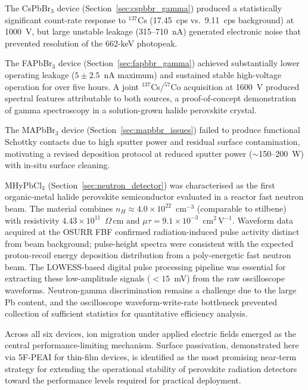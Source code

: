 The CsPbBr$_3$ device (Section~\ref{sec:cspbbr_gamma}) produced
a statistically significant count-rate response to $^{137}$Cs
(17.45~cps vs.\ 9.11~cps background) at 1000~V, but large
unstable leakage (315--710~nA) generated electronic noise that
prevented resolution of the 662-keV photopeak.

The FAPbBr$_3$ device (Section~\ref{sec:fapbbr_gamma}) achieved
substantially lower operating leakage ($5 \pm 2.5$~nA maximum)
and sustained stable high-voltage operation for over five hours.
A joint $^{137}$Cs/$^{57}$Co acquisition at 1600~V produced
spectral features attributable to both sources, a
proof-of-concept demonstration of gamma spectroscopy in a
solution-grown halide perovskite crystal.

The MAPbBr$_3$ device (Section~\ref{sec:mapbbr_issues}) failed
to produce functional Schottky contacts due to high sputter power
and residual surface contamination, motivating a revised
deposition protocol at reduced sputter power ($\sim$150--200~W)
with in-situ surface cleaning.

MHyPbCl$_3$ (Section~\ref{sec:neutron_detector}) was
characterised as the first organic-metal halide perovskite
semiconductor evaluated in a reactor fast neutron beam.  The
material combines $n_H \approx 4.0 \times 10^{22}$~cm$^{-3}$
(comparable to stilbene) with resistivity
$4.43 \times 10^{11}$~$\Omega$\,cm and
$\mu\tau = 9.1 \times 10^{-3}$~cm$^2$\,V$^{-1}$.  Waveform
data acquired at the OSURR FBF confirmed radiation-induced pulse
activity distinct from beam background; pulse-height spectra were
consistent with the expected proton-recoil energy deposition
distribution from a poly-energetic fast neutron beam.  The
LOWESS-based digital pulse processing pipeline was essential for
extracting these low-amplitude signals ($< 15$~mV) from the raw
oscilloscope waveforms.  Neutron-gamma discrimination remains a
challenge due to the large Pb content, and the oscilloscope
waveform-write-rate bottleneck prevented collection of sufficient
statistics for quantitative efficiency analysis.

Across all six devices, ion migration under applied electric
fields emerged as the central performance-limiting mechanism.
Surface passivation, demonstrated here via 5F-PEAI for
thin-film devices, is identified as the most promising
near-term strategy for extending the operational stability of
perovskite radiation detectors toward the performance levels
required for practical deployment.